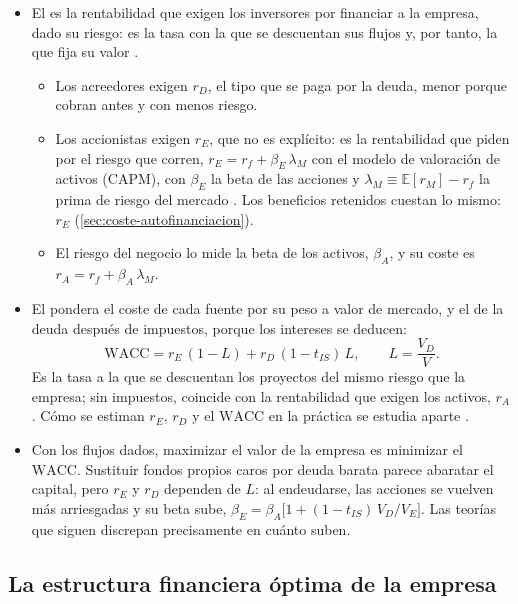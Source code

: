 \documentclass[11pt]{article}
\begin{document}
\begin{itemize}
\item El  es la rentabilidad que exigen los inversores por financiar a la empresa, dado su riesgo: es la tasa con la que se descuentan sus flujos y, por tanto, la que fija su valor .
  \begin{itemize}
  \item Los acreedores exigen $r_D$, el tipo que se paga por la deuda, menor porque cobran antes y con menos riesgo.
  \item Los accionistas exigen $r_E$, que no es explícito: es la rentabilidad que piden por el riesgo que corren, $r_E=r_f+\beta_E\,\lambda_M$ con el modelo de valoración de activos (CAPM), con $\beta_E$ la beta de las acciones y $\lambda_M\equiv\mathbb{E}[r_M]-r_f$ la prima de riesgo del mercado . Los beneficios retenidos cuestan lo mismo: $r_E$ (\ref{sec:coste-autofinanciacion}).
  \item El riesgo del negocio lo mide la beta de los activos, $\beta_A$, y su coste es $r_A=r_f+\beta_A\,\lambda_M$.
  \end{itemize}
\item El  pondera el coste de cada fuente por su peso a valor de mercado, y el de la deuda después de impuestos, porque los intereses se deducen:
  \begin{equation}\label{eq:wacc}
  \mathrm{WACC}=r_E\,(1-L)+r_D\,(1-t_{IS})\,L,\qquad L=\frac{V_D}{V}.
  \end{equation}
  Es la tasa a la que se descuentan los proyectos del mismo riesgo que la empresa; sin impuestos, coincide con la rentabilidad que exigen los activos, $r_A$. Cómo se estiman $r_E$, $r_D$ y el $\mathrm{WACC}$ en la práctica se estudia aparte .
\item Con los flujos dados, maximizar el valor de la empresa es minimizar el $\mathrm{WACC}$. Sustituir fondos propios caros por deuda barata parece abaratar el capital, pero $r_E$ y $r_D$ dependen de $L$: al endeudarse, las acciones se vuelven más arriesgadas y su beta sube, $\beta_E=\beta_A\big[1+(1-t_{IS})\,V_D/V_E\big]$\nocite{Hamada1972Effect}. Las teorías que siguen discrepan precisamente en cuánto suben.
\end{itemize}

\subsection{La estructura financiera óptima de la empresa}\label{sec:optima}
\end{document}
